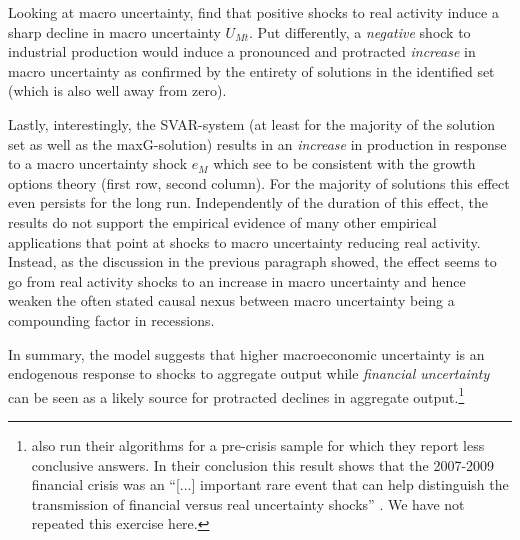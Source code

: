 \documentclass[a4paper,11pt,listof=nochaptergap,oneside,pointednumbers,bibtotoc,bigheadings,liststotoc]{scrbook}
\theoremstyle{mysatz}
\theoremstyle{mydefinition}
\theoremstyle{mytheorem}
\theoremstyle{mybemerkung}
\renewcommand*{\paragraph}[1]{\subsubsection*{#1} \vspace{-3mm}} %
\begin{document}
Looking at macro uncertainty, \citet{ludvigsonetal:18} find that positive shocks to real activity induce a sharp decline in macro uncertainty $U_{Mt}$. Put differently, a \textit{negative} shock to industrial production would induce a pronounced and protracted \textit{increase} in macro uncertainty as confirmed by the entirety of solutions in the identified set (which is also well away from zero). 

Lastly, interestingly, the SVAR-system (at least for the majority of the solution set as well as the maxG-solution) results in an \textit{increase} in production in response to a macro uncertainty shock $e_{M}$ which \citet{ludvigsonetal:18} see to be consistent with the growth options theory (first row, second column). For the majority of solutions this effect even persists for the long run. Independently of the duration of this effect, the results do not support the empirical evidence of many other empirical applications that point at shocks to macro uncertainty reducing real activity. Instead, as the discussion in the previous paragraph showed, the effect seems to go from real activity shocks to an increase in macro uncertainty and hence weaken the often stated causal nexus between macro uncertainty being a compounding factor in recessions. 

In summary, the model suggests that higher macroeconomic uncertainty is an endogenous response to shocks to aggregate output while \textit{financial uncertainty} can be seen as a likely source for protracted declines in aggregate output.\footnote{\citet{ludvigsonetal:18} also run their algorithms for a pre-crisis sample for which they report less conclusive answers. In their conclusion this result shows that the 2007-2009 financial crisis was an ``[...] important rare event that can help distinguish the transmission of financial versus real uncertainty shocks'' \citet[p. 25]{ludvigsonetal:18}. We have not repeated this exercise here.}








%
%
\end{document}
